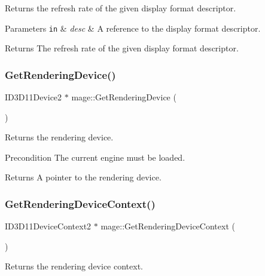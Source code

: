 Returns the refresh rate of the given display format descriptor.


\begin{DoxyParams}[1]{Parameters}
\mbox{\tt in}  & {\em desc} & A reference to the display format descriptor. \\
\hline
\end{DoxyParams}
\begin{DoxyReturn}{Returns}
The refresh rate of the given display format descriptor. 
\end{DoxyReturn}
\hypertarget{namespacemage_a30c7feb10b2be75bbce6d9c3739899c6}{}\label{namespacemage_a30c7feb10b2be75bbce6d9c3739899c6} 
\subsubsection{\texorpdfstring{Get\+Rendering\+Device()}{GetRenderingDevice()}}
{\footnotesize\ttfamily I\+D3\+D11\+Device2 $\ast$ mage\+::\+Get\+Rendering\+Device (\begin{DoxyParamCaption}{ }\end{DoxyParamCaption})}

Returns the rendering device.

\begin{DoxyPrecond}{Precondition}
The current engine must be loaded. 
\end{DoxyPrecond}
\begin{DoxyReturn}{Returns}
A pointer to the rendering device. 
\end{DoxyReturn}
\hypertarget{namespacemage_a55d3eaa7476e19ec8969e27d69249d95}{}\label{namespacemage_a55d3eaa7476e19ec8969e27d69249d95} 
\subsubsection{\texorpdfstring{Get\+Rendering\+Device\+Context()}{GetRenderingDeviceContext()}}
{\footnotesize\ttfamily I\+D3\+D11\+Device\+Context2 $\ast$ mage\+::\+Get\+Rendering\+Device\+Context (\begin{DoxyParamCaption}{ }\end{DoxyParamCaption})}

Returns the rendering device context.

